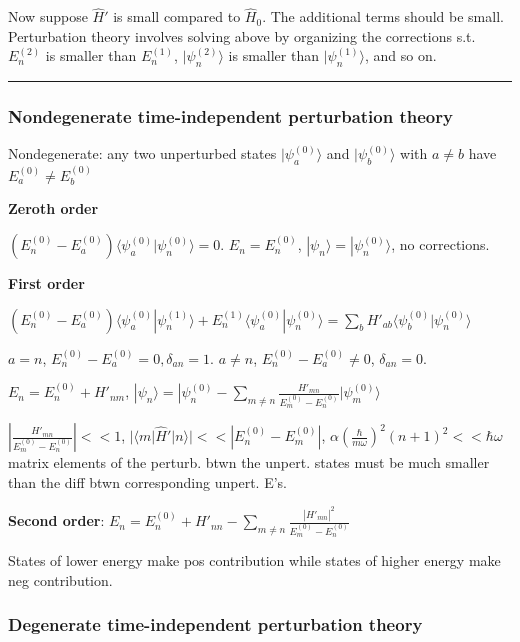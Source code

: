 Now suppose $\widehat{H}'$ is small compared to $\widehat{H}_0$. The additional terms should be small. Perturbation theory involves solving above by organizing the corrections s.t. $E_n^{(2)}$ is smaller than $E_n^{(1)}$, $|\psi_n^{(2)} \rangle$  is smaller than $|\psi_n^{(1)}\rangle$, and so on.

\hrule height 0.07pt

\subsubsection{Nondegenerate time-independent perturbation theory}

Nondegenerate: any two unperturbed states $|\psi_a^{(0)}\rangle$ and $|\psi_b^{(0)} \rangle$ with $a \neq b$ have $E_a^{(0)} \neq E_b^{(0)}$

\textbf{Zeroth order}

$(E_n^{(0)} - E_a^{(0)}) \langle \psi_a^{(0)} | \psi_n^{(0)} \rangle = 0$.
$E_n = E_n^{(0)}$, $|\psi_n \rangle = |\psi_n^{(0)} \rangle$, no corrections.

\textbf{First order}

$(E_n^{(0)} - E_a^{(0)}) \langle \psi_a^{(0)} | \psi_n^{(1)} \rangle + E_n^{(1)} \langle \psi_a^{(0)} | \psi_n^{(0)} \rangle = \sum_b H'_{ab} \langle \psi_b^{(0)} | \psi_n^{(0)} \rangle$

$a = n$, $E_n^{(0)} - E_a^{(0)} = 0, \delta_{an} = 1$.
$a \neq n$, $E_n^{(0)} - E_a^{(0)} \neq 0$, $\delta_{an} = 0$.

$E_n = E_n^{(0)} + H'_{nm}$, $|\psi_n \rangle = | \psi_n^{(0)} - \sum_{m \neq n} \frac{H'_{mn}}{E^{(0)}_m - E^{(0)}_n} | \psi_m^{(0)} \rangle$

$|\frac{H'_{mn}}{E_m^{(0)} - E_n^{(0)}}| << 1$, $|\langle m | \widehat{H}' | n \rangle | << |E_n^{(0)} - E_m^{(0)}|$, $\alpha (\frac{\hbar}{m \omega})^2 (n+1)^2 << \hbar \omega$ matrix elements of the perturb. btwn the unpert. states must be much smaller than the diff btwn corresponding unpert. E's. 

\textbf{Second order}:
$E_n = E_n^{(0)} + H'_{nn} - \sum_{m \neq n} \frac{|H'_{mn}|^2}{E_m^{(0)} - E_n^{(0)}}$

States of lower energy make pos contribution while states of higher energy make neg contribution.

\subsubsection{Degenerate time-independent perturbation theory}

